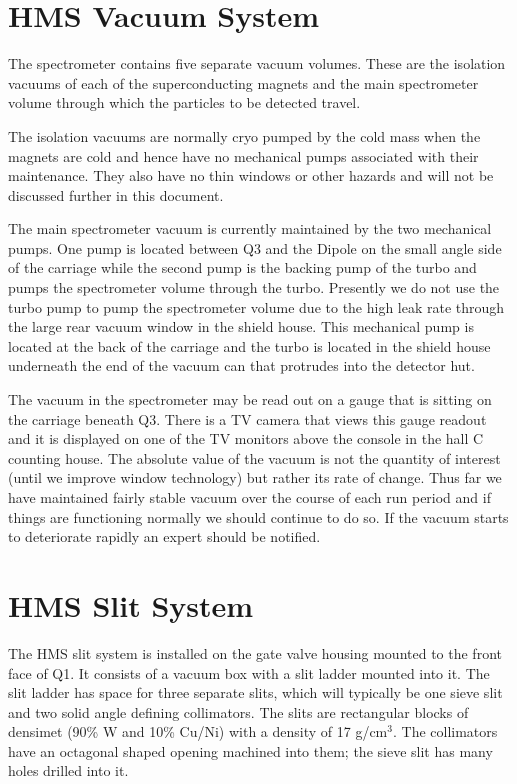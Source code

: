 \section{HMS Vacuum System}

	The spectrometer contains five separate vacuum volumes.
These are the isolation vacuums of each of the superconducting
magnets and the main spectrometer volume through which the particles
to be detected travel.

The isolation vacuums are normally cryo pumped by the cold mass when the
magnets are cold and hence have no mechanical pumps
associated with their maintenance. They also have no thin
windows or other hazards and will not be discussed further in this document.

The main spectrometer vacuum
is currently maintained by the two mechanical pumps.
One pump is located between Q3 and the Dipole on the small angle
side of the carriage while the second pump is the backing
pump of the turbo and pumps the spectrometer volume through the turbo.
Presently we do not use the turbo pump to pump the spectrometer volume due to
the high leak rate through the large rear vacuum window in the shield house.
This mechanical pump is located
at the back of the carriage and the turbo is located in the shield house
underneath the end of the vacuum can that protrudes into the detector hut.

The vacuum in the spectrometer may be read out on a gauge that is sitting on the
carriage beneath Q3. There is a TV camera that views this gauge readout and
it is displayed on one of the TV monitors above the console in the hall
C counting house. The absolute value of the vacuum is not the quantity
of interest (until we improve window technology) but rather its rate of change.
Thus far we have maintained fairly stable vacuum over the course of each run
period and if things are functioning normally we should continue to do so.
If the vacuum starts to deteriorate rapidly an expert should be notified.



\section{HMS Slit System}
\label{sec:hms_slit}

The HMS slit system is installed on the gate valve housing mounted to the
front face of Q1. It consists of a vacuum box with a slit ladder
mounted into it. The slit ladder has space for three separate slits,
which will typically be one sieve slit and two solid angle defining collimators.
The slits are rectangular blocks of densimet (90\% W and 10\% Cu/Ni)
with a density of 17 g/cm$^3$. The collimators have an octagonal shaped
opening machined into them; the sieve slit has many holes drilled
into it.

